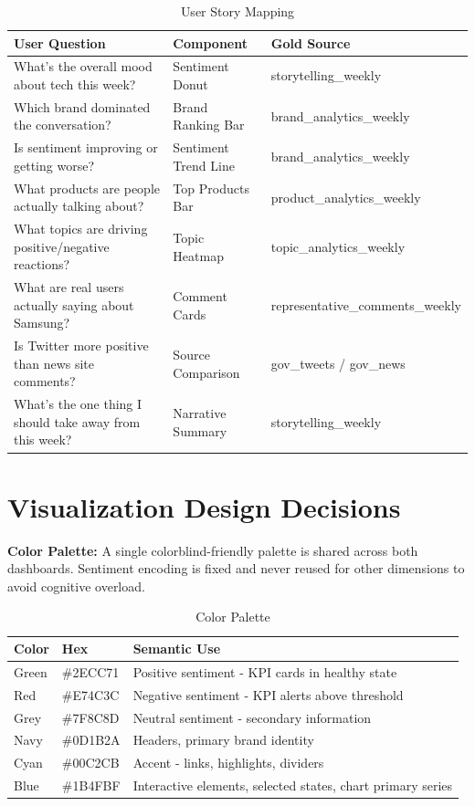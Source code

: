 \documentclass[12pt, a4paper]{article}
\begin{document}
\begin{table}[h]
\centering
\small
\renewcommand{\arraystretch}{1.3}
\begin{tabularx}{\textwidth}{X l l}
\toprule
\textbf{User Question} & \textbf{Component} & \textbf{Gold Source} \\
\midrule
What's the overall mood about tech this week? & Sentiment Donut & storytelling\_weekly \\
Which brand dominated the conversation? & Brand Ranking Bar & brand\_analytics\_weekly \\
Is sentiment improving or getting worse? & Sentiment Trend Line & brand\_analytics\_weekly \\
What products are people actually talking about? & Top Products Bar & product\_analytics\_weekly \\
What topics are driving positive/negative reactions? & Topic Heatmap & topic\_analytics\_weekly \\
What are real users actually saying about Samsung? & Comment Cards & representative\_comments\_weekly \\
Is Twitter more positive than news site comments? & Source Comparison & gov\_tweets / gov\_news \\
What's the one thing I should take away from this week? & Narrative Summary & storytelling\_weekly \\
\bottomrule
\end{tabularx}
\caption{User Story Mapping}
\end{table}

\section{Visualization Design Decisions}
\textbf{Color Palette:} A single colorblind-friendly palette is shared across both dashboards. Sentiment encoding is fixed and never reused for other dimensions to avoid cognitive overload.

\begin{table}[h]
\centering
\begin{tabular}{l l l}
\toprule
\textbf{Color} & \textbf{Hex} & \textbf{Semantic Use} \\
\midrule
Green & \#2ECC71 & Positive sentiment - KPI cards in healthy state \\
Red & \#E74C3C & Negative sentiment - KPI alerts above threshold \\
Grey & \#7F8C8D & Neutral sentiment - secondary information \\
Navy & \#0D1B2A & Headers, primary brand identity \\
Cyan & \#00C2CB & Accent - links, highlights, dividers \\
Blue & \#1B4FBF & Interactive elements, selected states, chart primary series \\
\bottomrule
\end{tabular}
\caption{Color Palette}
\end{table}
\end{document}
